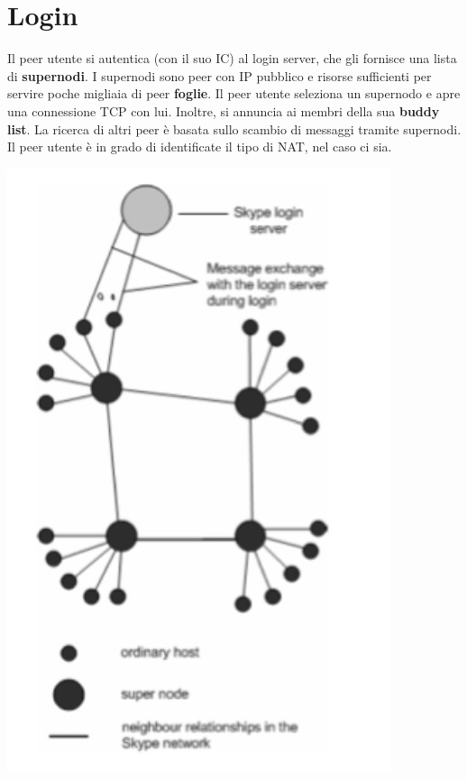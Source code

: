 \section{Login}
Il peer utente si autentica (con il suo IC) al login server, che gli fornisce una lista di \textbf{supernodi}. I supernodi sono peer con IP pubblico e risorse sufficienti per servire poche migliaia di peer \textbf{foglie}. Il peer utente seleziona un supernodo e apre una connessione TCP con lui. Inoltre, si annuncia ai membri della sua \textbf{buddy list}. La ricerca di altri peer è basata sullo scambio di messaggi tramite supernodi. Il peer utente è in grado di identificate il tipo di NAT, nel caso ci sia. 

\begin{center}
    \includegraphics[scale = 0.4]{Images/P2P/Skype.jpg}
\end{center}

